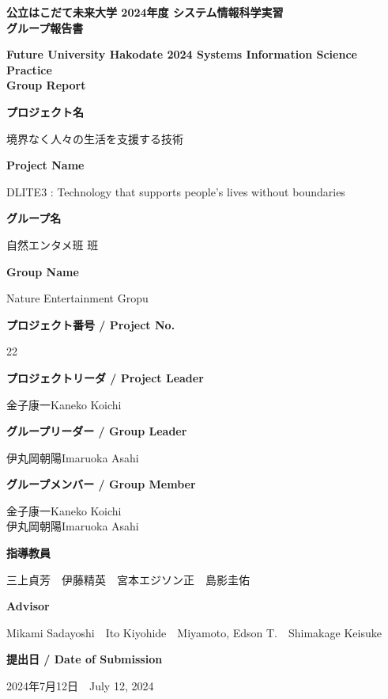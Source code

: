 \documentclass[12pt,a4paper]{report}
\newcommand{\AgendaBox}[2]{
    \large
    \textbf{#1}\\

    \vspace{0.2cm}

    \small 
    #2

    \vspace{0.5cm}
}
\newcommand{\NameBox}[2]{
    \small 
    #1\hspace{1cm}#2
}
\begin{document}
\thispagestyle{empty}
\begin{center}
    \large
    \textbf{
      公立はこだて未来大学 2024年度 システム情報科学実習\\
      グループ報告書
    }\\

    \vspace{0.2cm}

    \small 
    \textbf{
      Future University Hakodate 2024 Systems Information Science Practice\\Group Report
    }

    \vspace{0.5cm}

    \AgendaBox{プロジェクト名}{境界なく人々の生活を支援する技術}
    \AgendaBox{Project Name}{DLITE3 : Technology that supports people's lives without boundaries}
    \AgendaBox{グループ名}{自然エンタメ班 班}
    \AgendaBox{Group Name}{Nature Entertainment Gropu}
    \AgendaBox{プロジェクト番号 / Project No.}{22}
    \AgendaBox{プロジェクトリーダ / Project Leader}{金子康一\hspace{1cm}Kaneko Koichi}
    \AgendaBox{グループリーダー / Group Leader}{
      \NameBox{伊丸岡朝陽}{Imaruoka Asahi}\\
    }
    \AgendaBox{グループメンバー / Group Member}{
      \NameBox{金子康一}{Kaneko Koichi}\\
      \NameBox{伊丸岡朝陽}{Imaruoka Asahi}\\
    }
    \AgendaBox{指導教員}{
      三上貞芳　伊藤精英　宮本エジソン正　島影圭佑
    }
    \AgendaBox{Advisor}{
      Mikami Sadayoshi　Ito Kiyohide　Miyamoto, Edson T.　Shimakage Keisuke
    }
    \AgendaBox{提出日 / Date of Submission}{
      2024年7月12日　July 12, 2024
    }
    

\end{center}

\newpage
\thispagestyle{empty}
\mbox{}
\newpage

\clearpage
{}
\setcounter{page}{1}
\end{document}
